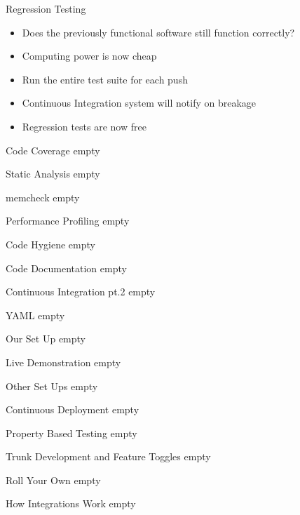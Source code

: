 \documentclass{beamer}
\begin{document}
\begin{frame}{Regression Testing}
	\begin{itemize}
		\item Does the previously functional software still function correctly?
		\item Computing power is now cheap
		\item Run the entire test suite for each push
		\item Continuous Integration system will notify on breakage
		\item Regression tests are now free
	\end{itemize}
\end{frame}

\begin{frame}{Code Coverage}
	empty
\end{frame}

\begin{frame}{Static Analysis}
	empty
\end{frame}

\begin{frame}{memcheck}
	empty
\end{frame}

\begin{frame}{Performance Profiling}
	empty
\end{frame}

\begin{frame}{Code Hygiene}
	empty
\end{frame}

\begin{frame}{Code Documentation}
	empty
\end{frame}

\begin{frame}{Continuous Integration pt.2}
	empty
\end{frame}

\begin{frame}{YAML}
	empty
\end{frame}

\begin{frame}{Our Set Up}
	empty
\end{frame}

\begin{frame}{Live Demonstration}
	empty
\end{frame}

\begin{frame}{Other Set Ups}
	empty
\end{frame}

\begin{frame}{Continuous Deployment}
	empty
\end{frame}

\begin{frame}{Property Based Testing}
	empty
\end{frame}

\begin{frame}{Trunk Development and Feature Toggles}
	empty
\end{frame}

\begin{frame}{Roll Your Own}
	empty
\end{frame}

\begin{frame}{How Integrations Work}
	empty
\end{frame}
\end{document}
